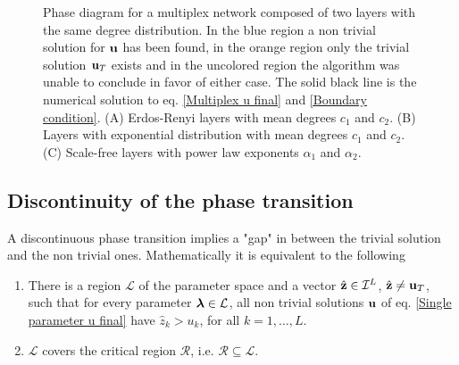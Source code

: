 \documentclass[
11pt, %
english, %
singlespacing, %
nolistspacing, %
liststotoc, %
headsepline, %
]{MastersDoctoralThesis} %
\begin{document}
{\begin{figure}
	\caption{Phase diagram for a multiplex network composed of two layers with the same degree distribution. In the blue region a non trivial solution for $\boldsymbol{\mathrm{u}}$ has been found, in the orange region only the trivial solution $\boldsymbol{\mathrm{u}}_T$ exists and in the uncolored region the algorithm was unable to conclude in favor of either case. The solid black line is the numerical solution to eq. \eqref{Multiplex u final} and \eqref{Boundary condition}. (A) Erdos-Renyi layers with mean degrees $c_1$ and $c_2$. (B) Layers with exponential distribution with mean degrees $c_1$ and $c_2$. (C) Scale-free layers with power law exponents $\alpha_1$ and $\alpha_2$.}
	\label{Figure: Regions and boundary}
\end{figure}
}

\subsection{Discontinuity of the phase transition}
\label{Section: Discontinuous phase transition}

A discontinuous phase transition implies a "gap" in between the trivial solution and the non trivial ones. Mathematically it is equivalent to the following
\begin{enumerate}
	\item There is a region $\mathcal{L}$ of the parameter space and a vector $\hat{\boldsymbol{\mathrm{z}}} \in \mathcal{I}^L$, $\hat{\boldsymbol{\mathrm{z}}} \neq \boldsymbol{\mathrm{u}}_T$, such that for every parameter $\boldsymbol{\mathrm{\lambda}} \in \mathcal{L}$, all non trivial solutions $\boldsymbol{\mathrm{u}}$ of eq. \eqref{Single parameter u final} have $\hat{z}_k > u_k$, for all $k = 1, \dots, L$.
	\item $\mathcal{L}$ covers the critical region $\mathcal{R}$, i.e. $\mathcal{R} \subseteq \mathcal{L}$.
\end{enumerate}
\end{document}
